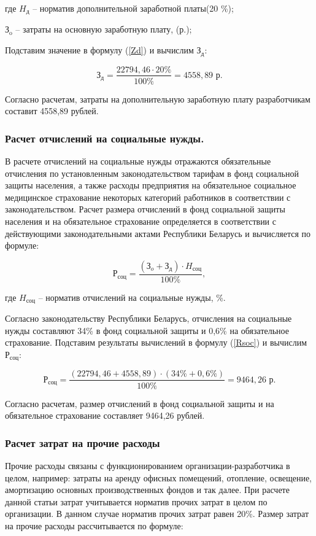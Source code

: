 где $H_\text{д}$ -- норматив дополнительной              заработной платы(20 \%);

   $\text{З}_{\text{o}}$ -- затраты на основную заработную плату, (р.);




Подставим значение в формулу (\ref{Zd}) и вычислим $\text{З}_{\text{д}}$:

$$
\text{З}_{\text{д}} = \frac{22794,46 \cdot 20\%}{100\%} = 4558,89 \text{ р.}
$$

Согласно расчетам, затраты на дополнительную заработную плату разработчикам составит 4558,89 рублей.

\subsubsection{Расчет отчислений на социальные нужды. }
В расчете отчислений на социальные нужды отражаются обязательные отчисления по установленным законодательством тарифам в фонд социальной защиты населения, а также расходы предприятия на обязательное социальное медицинское страхование некоторых категорий работников в соответствии с законодательством. Расчет размера отчислений в фонд социальной защиты населения и на обязательное страхование определяется в соответствии с действующими законодательными актами Республики Беларусь и вычисляется по формуле:

\begin{equation}
\label{Rsoc}
    \text{Р}_{\text{соц}} = \frac{(\text{З}_{o} + \text{З}_{\text{д}})\cdot H_\text{соц}}{100\%},
\end{equation}
 
где $H_\text{соц}$ -- норматив отчислений на социальные нужды, \%.

Согласно законодательству Республики Беларусь, отчисления на социальные нужды составляют 34\% в фонд социальной защиты и 0,6\% на обязательное страхование. Подставим результаты вычислений в формулу (\ref{Rsoc}) и вычислим $\text{Р}_{\text{соц}}$:
 
$$
 \text{Р}_{\text{соц}} = \frac{(22794,46 + 4558,89)\cdot (34\% + 0,6\%)}{100\%} = 9464,26 \text{ р.}
$$

Согласно расчетам, размер отчислений в фонд социальной защиты и на обязательное страхование составляет 9464,26  рублей.
\subsubsection{Расчет затрат на прочие расходы}
Прочие расходы связаны с функционированием организации-разработчика в целом, например: затраты на аренду офисных помещений, отопление, освещение, амортизацию основных производственных фондов и так далее. При расчете данной статьи затрат учитывается норматив прочих затрат в целом по организации. В данном случае норматив прочих затрат равен 20\%. Размер затрат на прочие расходы рассчитывается по формуле:

